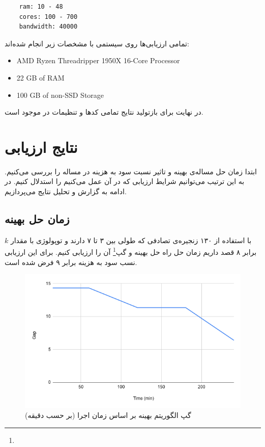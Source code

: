 \begin{latin}
    \begin{verbatim}
    ram: 10 - 48
    cores: 100 - 700
    bandwidth: 40000
    \end{verbatim}
\end{latin}

تمامی ارزیابی‌ها روی سیستمی با مشخصات زیر انجام شده‌اند:

\begin{latin}
    \begin{itemize}
        \item AMD Ryzen Threadripper 1950X 16-Core Processor
        \item 22 GB of RAM
        \item 100 GB of non-SSD Storage
    \end{itemize}
\end{latin}

در نهایت برای بازتولید نتایج تمامی کدها و تنظیمات در \cite{RoadToMSc} موجود است.

\section{نتایج ارزیابی}
ابتدا زمان حل مساله‌ی بهینه و تاثیر نسبت سود به هزینه در مساله را بررسی می‌کنیم.
به این ترتیب می‌توانیم شرایط ارزیابی که در آن عمل می‌کنیم را استدلال کنیم.
در ادامه به گزارش و تحلیل نتایج می‌پردازیم.

\subsection{زمان حل بهینه}
با استفاده از ۱۳۰ زنجیره‌ی تصادفی که طولی بین ۳ تا ۷ دارند
و توپولوژی  با مقدار \(k\) برابر ۸ قصد داریم
زمان حل راه حل بهینه و گپ\footnote{} آن را ارزیابی کنیم. برای این ارزیابی نسب سود به هزینه برابر ۹ فرض شده است.


\begin{figure}[h]
\center\includegraphics[scale=.5]{images/chart-5}
\caption{گپ الگوریتم بهینه بر اساس زمان اجرا (بر حسب دقیقه)}
\label{fig.10}
\end{figure}

